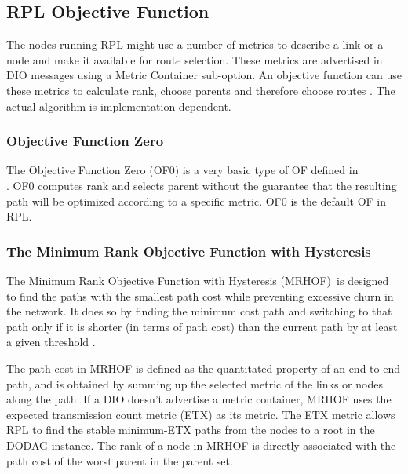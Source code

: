 \subsection{RPL Objective Function}
\label{RPL:OF}
The nodes running RPL might use a number of metrics to describe a link or a node and make it available for route selection. These metrics are advertised in DIO messages using a Metric Container sub-option. An objective function can use these metrics to calculate rank, choose parents and therefore choose routes \cite{MRHOF}. The actual algorithm is implementation-dependent.

\subsubsection{Objective Function Zero}
\label{RPL:OF0}
The Objective Function Zero (OF0) is a very basic type of OF defined in \\ \cite{draft-ietf-roll-of0-19}. OF0 computes rank and selects parent without the guarantee that the resulting path will be optimized according to a specific metric. OF0 is the default OF in RPL.
 
\subsubsection{The Minimum Rank Objective Function with Hysteresis}
\label{RPL:MRHOF}
The Minimum Rank Objective Function with Hysteresis (MRHOF)\, is designed to find the paths with the smallest path cost while preventing excessive churn in the network. It does so by finding the minimum cost path and switching to that path only if it is shorter (in terms of path cost) than the current path by at least a given threshold \cite{MRHOF}. 
\newline

The path cost in MRHOF is defined as the quantitated property of an end-to-end path, and is obtained by summing up the selected metric of the links or nodes along the path. If a DIO doesn't advertise a metric container, MRHOF uses the expected transmission count metric (ETX) as its metric. The ETX metric allows RPL to find the stable minimum-ETX paths from the nodes to a root in the DODAG instance. The rank of a node in MRHOF is directly associated with the path cost of the worst parent in the parent set.

